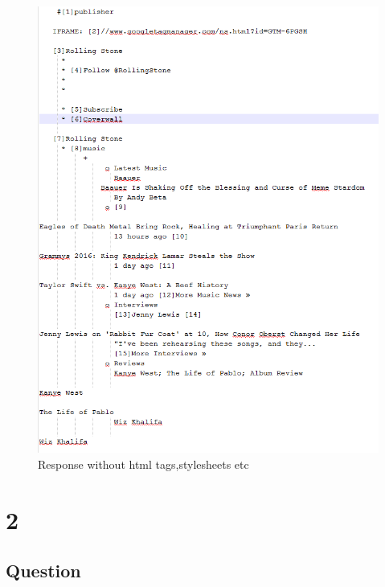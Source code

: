 \documentclass[letterpaper,11pt]{article}
\begin{document}
\begin{figure}
\includegraphics[scale=0.6]{sampleprocessed.png}
\caption{Response without html tags,stylesheets etc}

\end{figure}






\newpage
\section*{2}

\subsection*{Question}
\end{document}
